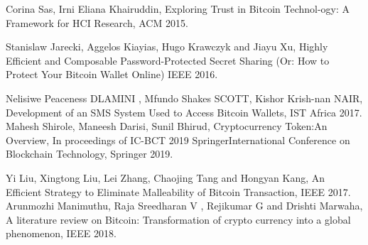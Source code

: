 \documentclass[12pt]{article}
\begin{document}
\newpage
\renewcommand{\thepage}{}
\begin{center}

\end{center}
     \begin{thebibliography}{99}
 Corina Sas, Irni Eliana Khairuddin, Exploring Trust in Bitcoin
Technol-ogy: A Framework for HCI Research, ACM 2015. 

Stanislaw Jarecki, Aggelos Kiayias, Hugo Krawczyk and Jiayu Xu,
Highly Efficient and Composable Password-Protected Secret Sharing
(Or: How to Protect Your Bitcoin Wallet Online) IEEE 2016. 

Nelisiwe Peaceness DLAMINI , Mfundo Shakes SCOTT, Kishor
Krish-nan NAIR, Development of an SMS System Used to Access
Bitcoin Wallets, IST Africa 2017. 
Mahesh Shirole, Maneesh Darisi, Sunil Bhirud, Cryptocurrency
Token:An Overview, In proceedings of IC-BCT 2019
SpringerInternational Conference on Blockchain Technology,
Springer 2019. 

Yi Liu, Xingtong Liu, Lei Zhang, Chaojing Tang and Hongyan Kang,
An Efficient Strategy to Eliminate Malleability of Bitcoin Transaction,
IEEE 2017. 
Arunmozhi Manimuthu, Raja Sreedharan V , Rejikumar G and Drishti
Marwaha, A literature review on Bitcoin: Transformation of crypto
currency into a global phenomenon, IEEE 2018. 


\end{thebibliography}
\end{document}
